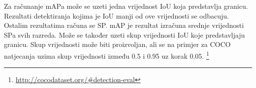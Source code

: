 Za računanje mAPa može se uzeti jedna vrijednost IoU koja predstavlja granicu. Rezultati detektiranja kojima je IoU manji od ove vrijednosti se odbacuju.
Ostalim rezultatima računa se SP. mAP je rezultat izračuna srednje vrijednosti SPa svih razreda. Može se također uzeti skup vrijednosti IoU koje predstavljaju granicu. 
Skup vrijednosti može biti proizvoljan, ali se na primjer za COCO natjecanja uzima skup vrijednosti između 0.5 i 0.95 uz korak 0.05. \footnote{\url{http://cocodataset.org/\#detection-eval}}